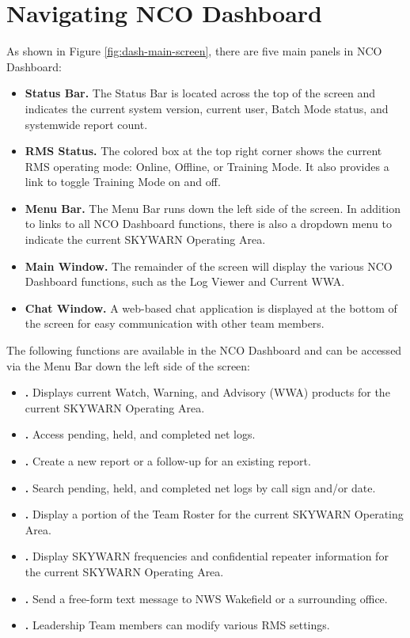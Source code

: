 \documentclass[pdflatex,letterpaper,twoside,12pt]{book}
\begin{document}

\section{Navigating NCO Dashboard}

As shown in Figure \ref{fig:dash-main-screen}, there are five main panels in NCO Dashboard:

\begin{itemize}
\item \textbf{Status Bar.} The Status Bar is located across the top of the screen and indicates the current system version, current user, Batch Mode status, and systemwide report count.
\item \textbf{RMS Status.}  The colored box at the top right corner shows the current RMS operating mode:  Online, Offline, or Training Mode.  It also provides a link to toggle Training Mode on and off.
\item \textbf{Menu Bar.}  The Menu Bar runs down the left side of the screen.  In addition to links to all NCO Dashboard functions, there is also a dropdown menu to indicate the current SKYWARN Operating Area.
\item \textbf{Main Window.}  The remainder of the screen will display the various NCO Dashboard functions, such as the Log Viewer and Current WWA.
\item \textbf{Chat Window.}  A web-based chat application is displayed at the bottom of the screen for easy communication with other team members.
\end{itemize}

The following functions are available in the NCO Dashboard and can be accessed via the Menu Bar down the left side of the screen:

\begin{itemize}
\item \textbf{.}  Displays current Watch, Warning, and Advisory (WWA) products for the current SKYWARN Operating Area.
\item \textbf{.}  Access pending, held, and completed net logs.
\item \textbf{.}  Create a new report or a follow-up for an existing report.
\item \textbf{.}  Search pending, held, and completed net logs by call sign and/or date.
\item \textbf{.}  Display a portion of the Team Roster for the current SKYWARN Operating Area.
\item \textbf{.}  Display SKYWARN frequencies and confidential repeater information for the current SKYWARN Operating Area.
\item \textbf{.}  Send a free-form text message to NWS Wakefield or a surrounding office.
\item \textbf{.}  Leadership Team members can modify various RMS settings.
\end{itemize}
\end{document}
